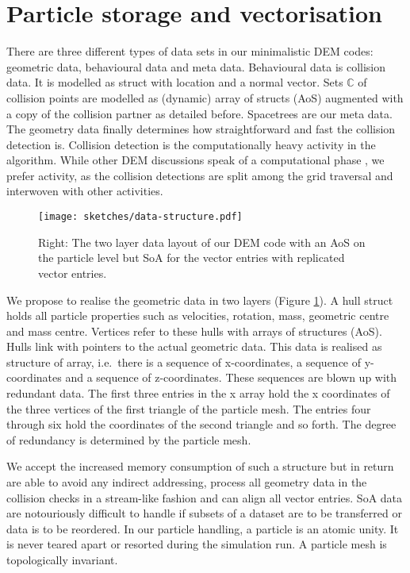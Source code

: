 \section{Particle storage and vectorisation}
\label{section:vectorisation}

There are three different types of data sets in our minimalistic DEM codes: 
geometric data, behavioural data and meta data. 
Behavioural data is collision data.
It is modelled as struct with location and a normal vector.
Sets $\mathbb{C}$ of collision points are modelled as (dynamic) array of structs
(AoS) augmented with a copy of the collision partner as detailed before.
Spacetrees are our meta data.
The geometry data finally determines how straightforward and fast the collision
detection is. Collision detection is the computationally heavy activity in the
algorithm.
While other DEM discussions speak of a computational phase \cite{xxxx}, we
prefer activity, as the collision detections are split among the grid traversal
and interwoven with other activities.

\begin{figure}
 \begin{center}
  \texttt{[image: sketches/data-structure.pdf]}
 \end{center}
 \caption{
   Right: The two layer data layout of our DEM code with an AoS on the particle
   level but SoA for the vector entries with replicated vector entries.
 }
 \label{figure:data-structure}
\end{figure}

We propose to realise the geometric data in two layers (Figure
\ref{figure:data-structure}).
A hull struct holds all particle properties such as velocities, rotation, mass,
geometric centre and mass centre.
Vertices refer to these hulls with arrays of structures (AoS).
Hulls link with pointers to the actual geometric data. 
This data is realised as structure of array, i.e.~there is a sequence of
x-coordinates, a sequence of y-coordinates and a sequence of z-coordinates.
These sequences are blown up with redundant data.
The first three entries in the x array hold the x coordinates of the three
vertices of the first triangle of the particle mesh.
The entries four through six hold the coordinates of the second triangle and so
forth. 
The degree of redundancy is determined by the particle mesh.

We accept the increased memory consumption of such a structure but in return are
able to avoid any indirect addressing, process all geometry data in the
collision checks in a stream-like fashion and can align all vector entries. 
SoA data are notouriously difficult to handle if subsets of a dataset are to be
transferred or data is to be reordered.
In our particle handling, a particle is an atomic unity.
It is never teared apart or resorted during the simulation run.
A particle mesh is topologically invariant.

